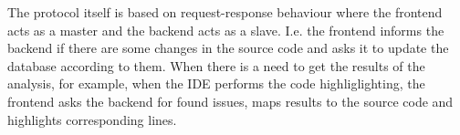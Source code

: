 The protocol itself is based on request-response behaviour where the frontend acts as a master and the backend acts as a slave.
I.e. the frontend informs the backend if there are some changes in the source code and asks it to update the database according to them.
When there is a need to get the results of the analysis, for example, when the IDE performs the code highliglighting, the frontend asks the backend for found issues, maps results to the source code and highlights corresponding lines.
